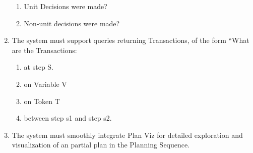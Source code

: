\documentclass[twoside, 11pt]{article}
\begin{document}
\begin{enumerate}
\begin{enumerate}
\item Unit Decisions were made?
\item Non-unit decisions were made?
\end{enumerate}
\item The system must support queries returning Transactions, of the form ``What are the Transactions:
\begin{enumerate}
\item at step S.
\item on Variable V
\item on Token T
\item between step s1 and step s2.
\end{enumerate}
\item The system must smoothly integrate Plan Viz for detailed exploration and visualization of an partial plan in the Planning Sequence.
\end{enumerate}
\end{document}
